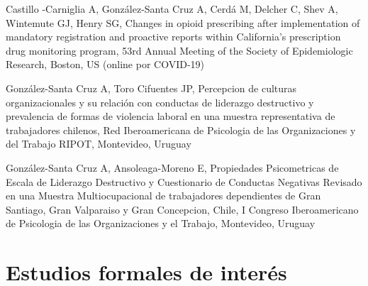 \documentclass[11pt,a4paper,]{awesome-cv}
\begin{document}
\begin{cventries}
{\begin{cvitems}
\item Castillo -Carniglia A, González-Santa Cruz A, Cerdá M, Delcher C, Shev A, Wintemute GJ, Henry SG, Changes in opioid prescribing after implementation of mandatory registration and proactive reports within California's prescription drug monitoring program, 53rd Annual Meeting of the Society of Epidemiologic Research, Boston, US (online por COVID-19)
\item González-Santa Cruz A, Toro Cifuentes JP, Percepcion de culturas organizacionales y su relación con conductas de liderazgo destructivo y prevalencia de formas de violencia laboral en una muestra representativa de trabajadores chilenos, Red Iberoamericana de Psicologia de las Organizaciones y del Trabajo RIPOT, Montevideo, Uruguay
\item González-Santa Cruz A, Ansoleaga-Moreno E, Propiedades Psicometricas de Escala de Liderazgo Destructivo y Cuestionario de Conductas Negativas Revisado en una Muestra Multiocupacional de trabajadores dependientes de Gran Santiago, Gran Valparaiso y Gran Concepcion, Chile, I Congreso Iberoamericano de Psicologia de las Organizaciones y el Trabajo, Montevideo, Uruguay
\end{cvitems}}
\end{cventries}

\hypertarget{estudios-formales-de-interuxe9s-1}{%
\section{Estudios formales de
interés}\label{estudios-formales-de-interuxe9s-1}}

\fontsize{10pt}{1.5em}\color{text}
\begin{cventries}
    \vspace{-4.0mm}
    \vspace{-4.0mm}
    \vspace{-4.0mm}
    \vspace{-4.0mm}
    \vspace{-4.0mm}
\end{cventries}

\pagebreak

\linebreak
\end{document}
